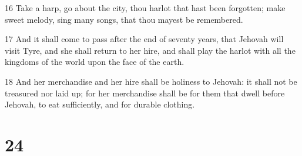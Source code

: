 \par 16 Take a harp, go about the city, thou harlot that hast been forgotten; make sweet melody, sing many songs, that thou mayest be remembered.
\par 17 And it shall come to pass after the end of seventy years, that Jehovah will visit Tyre, and she shall return to her hire, and shall play the harlot with all the kingdoms of the world upon the face of the earth.
\par 18 And her merchandise and her hire shall be holiness to Jehovah: it shall not be treasured nor laid up; for her merchandise shall be for them that dwell before Jehovah, to eat sufficiently, and for durable clothing.

\chapter{24}

